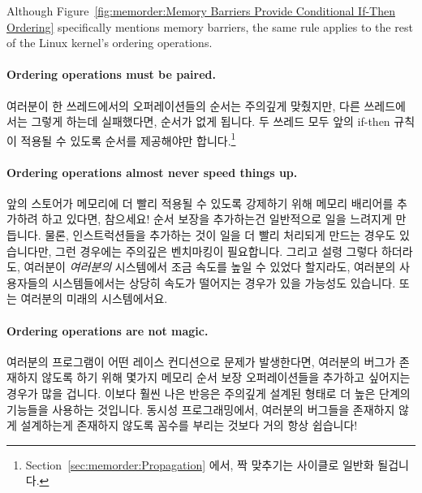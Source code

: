 Although
Figure~\ref{fig:memorder:Memory Barriers Provide Conditional If-Then Ordering}
specifically mentions memory barriers, the same rule applies to the
rest of the Linux kernel's ordering operations.
\fi

\paragraph{Ordering operations must be paired.}
여러분이 한 쓰레드에서의 오퍼레이션들의 순서는 주의깊게 맞췄지만, 다른
쓰레드에서는 그렇게 하는데 실패했다면, 순서가 없게 됩니다.
두 쓰레드 모두 앞의 if-then 규칙이 적용될 수 있도록 순서를 제공해야만
합니다.\footnote{
	Section~\ref{sec:memorder:Propagation} 에서, 짝 맞추기는 사이클로
	일반화 될겁니다.}

\paragraph{Ordering operations almost never speed things up.}
앞의 스토어가 메모리에 더 빨리 적용될 수 있도록 강제하기 위해 메모리 배리어를
추가하려 하고 있다면, 참으세요!
순서 보장을 추가하는건 일반적으로 일을 느려지게 만듭니다.
물론, 인스트럭션들을 추가하는 것이 일을 더 빨리 처리되게 만드는 경우도
있습니다만, 그런 경우에는 주의깊은 벤치마킹이 필요합니다.
그리고 설령 그렇다 하더라도, 여러분이 \emph{여러분의} 시스템에서 조금 속도를
높일 수 있었다 할지라도, 여러분의 사용자들의 시스템들에서는 상당히 속도가
떨어지는 경우가 있을 가능성도 있습니다.
또는 여러분의 미래의 시스템에서요.

\paragraph{Ordering operations are not magic.}
여러분의 프로그램이 어떤 레이스 컨디션으로 문제가 발생한다면, 여러분의 버그가
존재하지 않도록 하기 위해 몇가지 메모리 순서 보장 오퍼레이션들을 추가하고
싶어지는 경우가 많을 겁니다.
이보다 훨씬 나은 반응은 주의깊게 설계된 형태로 더 높은 단계의 기능들을 사용하는
것입니다.
동시성 프로그래밍에서, 여러분의 버그들을 존재하지 않게 설계하는게 존재하지
않도록 꼼수를 부리는 것보다 거의 항상 쉽습니다!
\iffalse

